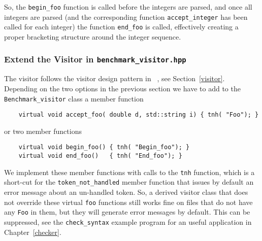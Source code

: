 \noindent
So, the \texttt{begin\_foo} function is called before the integers are
parsed, and once all integers are parsed (and the corresponding
function \texttt{accept\_integer} has been called for each integer) the
function \texttt{end\_foo} is called, effectively creating a proper
bracketing structure around the integer sequence.

\subsubsection{Extend the Visitor in \texttt{benchmark\_visitor.hpp}}
The visitor follows the visitor design pattern in
~\cite{cgal:ghjv-dpero-95}, see Section~\ref{visitor}.
Depending on the two options in the previous section we have to add to
the \texttt{Benchmark\_visitor} class a member function

\begin{verbatim}
    virtual void accept_foo( double d, std::string i) { tnh( "Foo"); }
\end{verbatim}

\noindent
or two member functions

\begin{verbatim}
    virtual void begin_foo() { tnh( "Begin_foo"); }
    virtual void end_foo()   { tnh( "End_foo"); }
\end{verbatim}

\noindent
We implement these member functions with calls to the \texttt{tnh}
function, which is a short-cut for the \texttt{token\_not\_handled}
member function that issues by default an error message about an
un-handled token. So, a derived visitor class that does not override
these virtual \texttt{foo} functions still works fine on files that do
not have any \texttt{Foo} in them, but they will generate error
messages by default. This can be suppressed, see the \texttt{check\_syntax}
example program for an useful application in Chapter~\ref{checker}.
